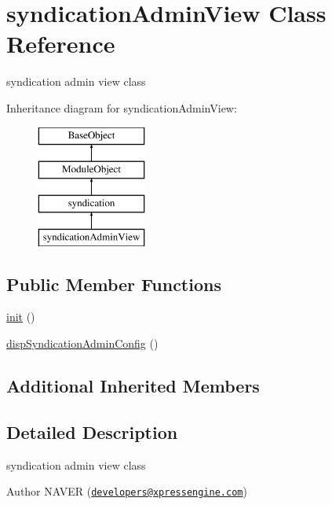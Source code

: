 \hypertarget{classsyndicationAdminView}{\section{syndication\-Admin\-View Class Reference}
\label{classsyndicationAdminView}
}


syndication admin view class  


Inheritance diagram for syndication\-Admin\-View\-:\begin{figure}[H]
\begin{center}
\leavevmode
\includegraphics[height=4.000000cm]{classsyndicationAdminView}
\end{center}
\end{figure}
\subsection*{Public Member Functions}
\begin{DoxyCompactItemize}
\item 
\hyperlink{classsyndicationAdminView_ab7a2d4ecc5fd0238c75a711b816211b4}{init} ()
\item 
\hyperlink{classsyndicationAdminView_a126fc89c288f9fe42b5c2e809e15c8a9}{disp\-Syndication\-Admin\-Config} ()
\end{DoxyCompactItemize}
\subsection*{Additional Inherited Members}


\subsection{Detailed Description}
syndication admin view class 

\begin{DoxyAuthor}{Author}
N\-A\-V\-E\-R (\href{mailto:developers@xpressengine.com}{\tt developers@xpressengine.\-com}) 
\end{DoxyAuthor}



